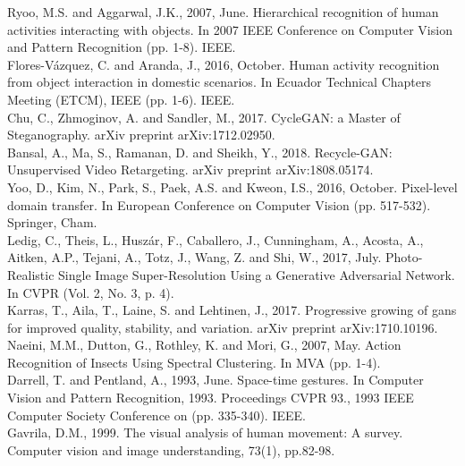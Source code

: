 \newline
[30] Ryoo, M.S. and Aggarwal, J.K., 2007, June. Hierarchical recognition of human activities interacting with objects. In 2007 IEEE Conference on Computer Vision and Pattern Recognition (pp. 1-8). IEEE.\\
\newline
[31] Flores-Vázquez, C. and Aranda, J., 2016, October. Human activity recognition from object interaction in domestic scenarios. In Ecuador Technical Chapters Meeting (ETCM), IEEE (pp. 1-6). IEEE.\\
\newline
[32] Chu, C., Zhmoginov, A. and Sandler, M., 2017. CycleGAN: a Master of Steganography. arXiv preprint arXiv:1712.02950.\\
\newline
[33] Bansal, A., Ma, S., Ramanan, D. and Sheikh, Y., 2018. Recycle-GAN: Unsupervised Video Retargeting. arXiv preprint arXiv:1808.05174.\\
\newline
[34] Yoo, D., Kim, N., Park, S., Paek, A.S. and Kweon, I.S., 2016, October. Pixel-level domain transfer. In European Conference on Computer Vision (pp. 517-532). Springer, Cham.\\
\newline
[35] Ledig, C., Theis, L., Huszár, F., Caballero, J., Cunningham, A., Acosta, A., Aitken, A.P., Tejani, A., Totz, J., Wang, Z. and Shi, W., 2017, July. Photo-Realistic Single Image Super-Resolution Using a Generative Adversarial Network. In CVPR (Vol. 2, No. 3, p. 4).\\
\newline
[36] Karras, T., Aila, T., Laine, S. and Lehtinen, J., 2017. Progressive growing of gans for improved quality, stability, and variation. arXiv preprint arXiv:1710.10196.\\
\newline
[37] Naeini, M.M., Dutton, G., Rothley, K. and Mori, G., 2007, May. Action Recognition of Insects Using Spectral Clustering. In MVA (pp. 1-4).\\
\newline
[38] Darrell, T. and Pentland, A., 1993, June. Space-time gestures. In Computer Vision and Pattern Recognition, 1993. Proceedings CVPR 93., 1993 IEEE Computer Society Conference on (pp. 335-340). IEEE.\\
\newline
[39] Gavrila, D.M., 1999. The visual analysis of human movement: A survey. Computer vision and image understanding, 73(1), pp.82-98.\\
